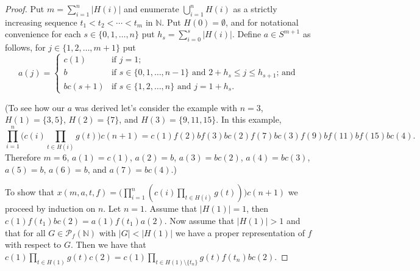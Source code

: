 \documentclass[12pt]{article}
\theoremstyle{plain}
\theoremstyle{definition}
\newcommand{\bbN}{\mathbb{N}}
\newcommand{\Pf}{\mathcal{P}_f}
\begin{document}
\begin{proof}
  Put $m = \sum_{i=1}^n |H(i)|$ and enumerate $\bigcup_{i=1}^n H(i)$ as a strictly increasing sequence $t_1 < t_2 < \cdots < t_m$ in $\bbN$.
  Put $H(0) = \emptyset$, and for notational convenience for each $s \in \{0, 1, \ldots, n\}$ put $h_s = \sum_{i = 0}^s |H(i)|$. 
  Define $a \in S^{m+1}$ as follows, for $j \in \{1, 2, \ldots, m+1\}$ put
  \[
    a(j) =
    \begin{cases}
      c(1) & \mbox{if $j = 1$;} \\
      b    & \mbox{if $s \in \{0, 1, \ldots, n-1\}$ and $2+h_s \le j \le h_{s+1}$; and} \\
      bc(s+1) & \mbox{if $s \in \{1, 2, \ldots, n\}$ and $j = 1+ h_s$.}
    \end{cases}
  \]

  (To see how our $a$ was derived let's consider the example with $n = 3$, $H(1) = \{3, 5\}$, $H(2) = \{7\}$, and $H(3) = \{9, 11, 15\}$. 
  In this example,
  \[
    \prod_{i=1}^n\bigl( c(i) \prod_{t \in H(i)} g(t) \bigr) c(n+1) = c(1)f(2)bf(3)b c(2) f(7)bc(3)f(9)bf(11)bf(15)bc(4).
  \]
  Therefore $m = 6$, $a(1) = c(1)$, $a(2) = b$, $a(3) = bc(2)$, $a(4) = bc(3)$, $a(5) = b$, $a(6) = b$, and $a(7) = bc(4)$.)

  To show that $x(m, a, t, f) = \bigl(\prod_{i=1}^n ( c(i)\prod_{t \in H(i)} g(t)) \bigr) c(n+1)$ we proceed by induction on $n$.
  Let $n = 1$.
  Assume that $|H(1)| = 1$, then $c(1)f(t_1)bc(2) = a(1) f(t_1) a(2)$. 
  Now assume that $|H(1)| > 1$ and that for all $G \in \Pf(\bbN)$ with $|G| < |H(1)|$ we have a proper representation of $f$ with respect to $G$. 
  Then we have that $c(1)\prod_{t \in H(1)} g(t)c(2) = c(1)\prod_{t \in H(1) \setminus \{t_n\}} g(t) f(t_n)b c(2)$. 

\end{proof}
\end{document}
